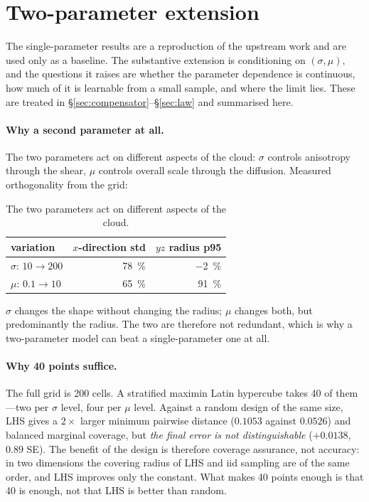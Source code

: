 ﻿\documentclass[11pt,a4paper]{article}
\begin{document}
\section{Two-parameter extension}

The single-parameter results are a reproduction of the upstream work and are used only as a
baseline. The substantive extension is conditioning on $(\sigma,\mu)$, and the questions it
raises are whether the parameter dependence is continuous, how much of it is learnable from a
small sample, and where the limit lies. These are treated in
\S\ref{sec:compensator}--\S\ref{sec:law} and summarised here.

\paragraph{Why a second parameter at all.} The two parameters act on different aspects of the
cloud: $\sigma$ controls anisotropy through the shear, $\mu$ controls overall scale through the
diffusion. Measured orthogonality from the grid:

\begin{table}[h]
\centering\small
\begin{tabular}{@{}lrr@{}}
\toprule
variation & $x$-direction std & $yz$ radius p95 \\
\midrule
$\sigma$: $10\to200$ & \SI{78}{\percent} & \SI{-2}{\percent} \\
$\mu$: $0.1\to10$ & \SI{65}{\percent} & \SI{91}{\percent} \\
\bottomrule
\end{tabular}
\caption{The two parameters act on different aspects of the cloud.}
\end{table}

$\sigma$ changes the shape without changing the radius; $\mu$ changes both, but predominantly the
radius. The two are therefore not redundant, which is why a two-parameter model can beat a
single-parameter one at all.

\paragraph{Why 40 points suffice.} The full grid is 200 cells. A stratified maximin Latin
hypercube takes 40 of them---two per $\sigma$ level, four per $\mu$ level. Against a random
design of the same size, LHS gives a $2\times$ larger minimum pairwise distance ($0.1053$ against
$0.0526$) and balanced marginal coverage, but \emph{the final error is not distinguishable}
($+0.0138$, $0.89$ SE). The benefit of the design is therefore coverage assurance, not accuracy:
in two dimensions the covering radius of LHS and iid sampling are of the same order, and LHS
improves only the constant. What makes 40 points enough is that 40 is enough, not that LHS is
better than random.
\end{document}
